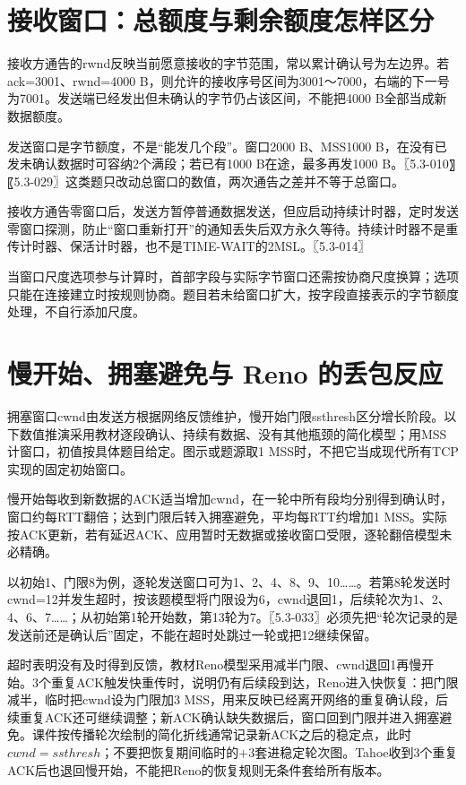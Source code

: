 \section{接收窗口：总额度与剩余额度怎样区分}\label{CN05-07}

接收方通告的rwnd反映当前愿意接收的字节范围，常以累计确认号为左边界。若ack=3001、rwnd=4000 B，则允许的接收序号区间为3001～7000，右端的下一号为7001。发送端已经发出但未确认的字节仍占该区间，不能把4000 B全部当成新数据额度。

发送窗口是字节额度，不是``能发几个段''。窗口2000 B、MSS1000 B，在没有已发未确认数据时可容纳2个满段；若已有1000 B在途，最多再发1000 B。〖5.3-010〗〖5.3-029〗这类题只改动总窗口的数值，两次通告之差并不等于总窗口。

接收方通告零窗口后，发送方暂停普通数据发送，但应启动持续计时器，定时发送零窗口探测，防止``窗口重新打开''的通知丢失后双方永久等待。持续计时器不是重传计时器、保活计时器，也不是TIME-WAIT的2MSL。〖5.3-014〗

当窗口尺度选项参与计算时，首部字段与实际字节窗口还需按协商尺度换算；选项只能在连接建立时按规则协商。题目若未给窗口扩大，按字段直接表示的字节额度处理，不自行添加尺度。

\section{慢开始、拥塞避免与 Reno 的丢包反应}\label{CN05-08}

拥塞窗口cwnd由发送方根据网络反馈维护，慢开始门限ssthresh区分增长阶段。以下数值推演采用教材逐段确认、持续有数据、没有其他瓶颈的简化模型；用MSS计窗口，初值按具体题目给定。图示或题源取1 MSS时，不把它当成现代所有TCP实现的固定初始窗口。

慢开始每收到新数据的ACK适当增加cwnd，在一轮中所有段均分别得到确认时，窗口约每RTT翻倍；达到门限后转入拥塞避免，平均每RTT约增加1 MSS。实际按ACK更新，若有延迟ACK、应用暂时无数据或接收窗口受限，逐轮翻倍模型未必精确。

以初始1、门限8为例，逐轮发送窗口可为1、2、4、8、9、10\ldots\ldots。若第8轮发送时cwnd=12并发生超时，按该题模型将门限设为6，cwnd退回1，后续轮次为1、2、4、6、7\ldots\ldots；从初始第1轮开始数，第13轮为7。〖5.3-033〗必须先把``轮次记录的是发送前还是确认后''固定，不能在超时处跳过一轮或把12继续保留。

超时表明没有及时得到反馈，教材Reno模型采用减半门限、cwnd退回1再慢开始。3个重复ACK触发快重传时，说明仍有后续段到达，Reno进入快恢复：把门限减半，临时把cwnd设为门限加3 MSS，用来反映已经离开网络的重复确认段，后续重复ACK还可继续调整；新ACK确认缺失数据后，窗口回到门限并进入拥塞避免。课件按传播轮次绘制的简化折线通常记录新ACK之后的稳定点，此时\(cwnd=ssthresh\)；不要把恢复期间临时的\(+3\)套进稳定轮次图。Tahoe收到3个重复ACK后也退回慢开始，不能把Reno的恢复规则无条件套给所有版本。

